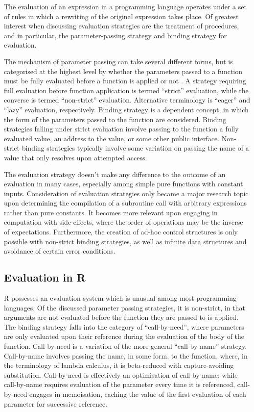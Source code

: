 The evaluation of an expression in a programming language operates under a set of rules in which a rewriting of the original expression takes place.
Of greatest interest when discussing evaluation strategies are the treatment of procedures, and in particular, the parameter-passing strategy and binding strategy for evaluation.

The mechanism of parameter passing can take several different forms, but is categorised at the highest level by whether the parameters passed to a function must be fully evaluated before a function is applied or not \cite{crank1991param}.
A strategy requiring full evaluation before function application is termed ``strict'' evaluation, while the converse is termed ``non-strict'' evaluation.
Alternative terminology is ``eager'' and ``lazy'' evaluation, respectively\cite{henderson1976lazy}.
Binding strategy is a dependent concept, in which the form of the parameters passed to the function are considered\cite{abelson1996sicp}.
Binding strategies falling under strict evaluation involve passing to the function a fully evaluated value, an address to the value, or some other public interface.
Non-strict binding strategies typically involve some variation on passing the name of a value that only resolves upon attempted access.

The evaluation strategy doesn't make any difference to the outcome of an evaluation in many cases, especially among simple pure functions with constant inputs.
Consideration of evaluation strategies only became a major research topic upon determining the compilation of a subroutine call with arbitrary expressions rather than pure constants.
It becomes more relevant upon engaging in computation with side-effects, where the order of operations may be the inverse of expectations.
Furthermore, the creation of ad-hoc control structures is only possible with non-strict binding strategies, as well as infinite data structures and avoidance of certain error conditions\cite{okasaki1998functional}.

\subsection{Evaluation in R}\label{sec:evalinr}

R possesses an evaluation system which is unusual among most programming languages.
Of the discussed parameter passing strategies, it is non-strict, in that arguments are not evaluated before the function they are passed to is applied\cite{rcore2020ints:argeval}.
The binding strategy falls into the category of ``call-by-need'', where parameters are only evaluated upon their reference during the evaluation of the body of the function\cite{ariola1995callbyneed}.
Call-by-need is a variation of the more general ``call-by-name'' strategy.
Call-by-name involves passing the name, in some form, to the function, where, in the terminology of lambda calculus, it is beta-reduced with capture-avoiding substitution\cite{fischer1972lambda}.
Call-by-need is effectively an optimisation of call-by-name; while call-by-name requires evaluation of the parameter every time it is referenced, call-by-need engages in memoisation, caching the value of the first evaluation of each parameter for successive reference.

